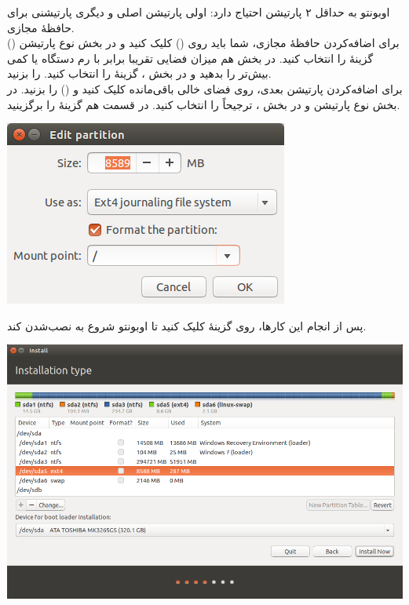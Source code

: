 اوبونتو به حداقل ۲ پارتیشن احتیاج دارد: اولی پارتیشن اصلی و دیگری پارتیشنی برای حافظهٔ مجازی.\\
برای اضافه‌کردن حافظهٔ مجازی، شما باید روی \lr{+} () کلیک کنید و در بخش نوع پارتیشن () گزینهٔ  را انتخاب کنید. در بخش  هم میزان فضایی تقریبا برابر با رم دستگاه یا کمی بیش‌تر را بدهید و در بخش ، گزینهٔ  را انتخاب کنید.  را بزنید.\\
برای اضافه‌کردن پارتیشن بعدی، روی فضای خالی باقی‌مانده کلیک کنید و \lr{+} () را بزنید. در بخش نوع پارتیشن  و در بخش ، ترجیحاً  را انتخاب کنید. در قسمت  هم گزینهٔ \lr{/} را برگزینید.\\
\begin{center}
\includegraphics[scale=0.6]{pics/7.png}\\
\end{center}
پس از انجام این کارها، روی گزینهٔ  کلیک کنید تا اوبونتو شروع به نصب‌شدن کند.

\begin{center}
\includegraphics[scale=0.5]{pics/8.png}\\
\end{center}

